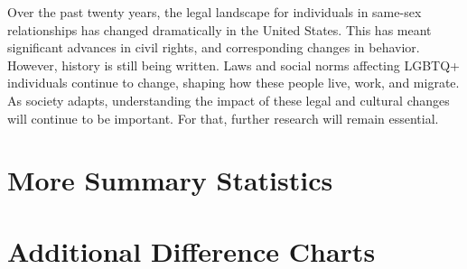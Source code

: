 \documentclass[12pt,letterpaper]{article}
\begin{document}
Over the past twenty years, the legal landscape for individuals in same-sex relationships has changed dramatically in the United States. This has meant significant advances in civil rights, and corresponding changes in behavior. However, history is still being written. Laws and social norms affecting LGBTQ+ individuals continue to change, shaping how these people live, work, and migrate. As society adapts, understanding the impact of these legal and cultural changes will continue to be important. For that, further research will remain essential.

\newpage



\newpage
\appendix
{}  %
\FloatBarrier

\section{More Summary Statistics}



\begin{landscape}

\end{landscape}


\FloatBarrier
\newpage
\section{Additional Difference Charts}



\end{document}
